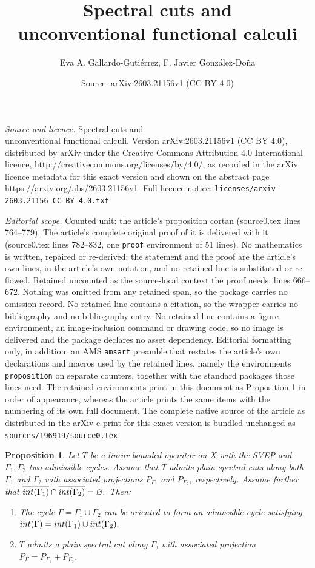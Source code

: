 \documentclass[10pt,a4paper]{amsart}
\title{Spectral cuts and \\ unconventional functional calculi}
\author{Eva A. Gallardo-Guti\'errez, F. Javier Gonz\'alez-Do\~na}
\date{Source: arXiv:2603.21156v1 (CC BY 4.0)}
\newtheorem{proposition}{Proposition}
\newcommand{\inte}{\textnormal{int}}
\begin{document}
\maketitle

\noindent\emph{Source and licence.} Spectral cuts and \\ unconventional functional calculi. Version arXiv:2603.21156v1 (CC BY 4.0), distributed by arXiv under the Creative Commons Attribution 4.0 International licence, http://creativecommons.org/licenses/by/4.0/, as recorded in the arXiv licence metadata for this exact version and shown on the abstract page https://arxiv.org/abs/2603.21156v1. Full licence notice: \texttt{licenses/arxiv-2603.21156-CC-BY-4.0.txt}.\par\smallskip

\noindent\textit{Editorial scope.} Counted unit: the article's proposition cortan (source0.tex lines 764--779). The article's complete original proof of it is delivered with it (source0.tex lines 782--832, one \texttt{proof} environment of 51 lines). No mathematics is written, repaired or re-derived: the statement and the proof are the article's own lines, in the article's own notation, and no retained line is substituted or re-flowed.  Retained uncounted as the source-local context the proof needs: lines 666--672.  Nothing was omitted from any retained span, so the package carries no omission record.  No retained line contains a citation, so the wrapper carries no bibliography and no bibliography entry.  No retained line contains a figure environment, an image-inclusion command or drawing code, so no image is delivered and the package declares no asset dependency.  Editorial formatting only, in addition: an AMS \texttt{amsart} preamble that restates the article's own declarations and macros used by the retained lines, namely the environments \texttt{proposition} on separate counters, together with the standard packages those lines need.  The retained environments print in this document as Proposition 1 in order of appearance, whereas the article prints the same items with the numbering of its own full document.  The complete native source of the article as distributed in the arXiv e-print for this exact version is bundled unchanged as \texttt{sources/196919/source0.tex}.
\begin{proposition}\label{proposicion union curvas}
Let $T$ be a linear bounded operator on $X$ with the SVEP and $\Gamma_1,\Gamma_2$ two admissible cycles. Assume that $T$ admits plain spectral cuts along both $\Gamma_1$ and $\Gamma_2$ with associated projections $P_{\Gamma_1}$ and $P_{\Gamma_2}$, respectively. Assume further that $\overline{\inte(\Gamma_1)}\cap \overline{\inte(\Gamma_2)}=\varnothing.$ Then:
    \begin{enumerate}
        \item [(i)] The cycle $\Gamma = \Gamma_1\cup \Gamma_2$ can be oriented to form an admissible cycle satisfying $\inte(\Gamma) = \inte(\Gamma_1)\cup \inte(\Gamma_2).$
        \item [(ii)] $T$ admits a plain spectral cut along $\Gamma$, with associated projection $P_\Gamma = P_{\Gamma_1}+P_{\Gamma_2}$.
    \end{enumerate}
\end{proposition}
\end{document}
